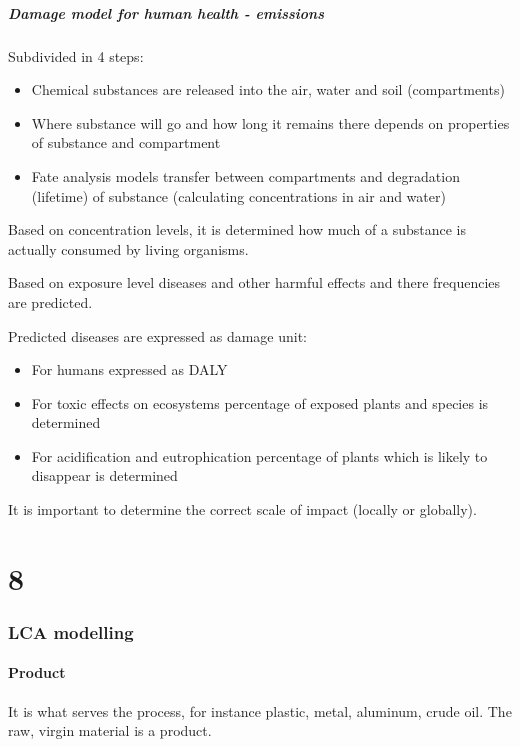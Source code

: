 \documentclass{article}
\begin{document}
\newpage
\subsubsection{Damage model for human health - emissions}
Subdivided in 4 steps:

\vspace*{-.4cm}
\begin{itemize}
    \item Chemical substances are released into the air, water and soil (compartments)
    \item Where substance will go and how long it remains there depends on properties of substance and compartment
    \item Fate analysis models transfer between compartments and degradation (lifetime) of substance (calculating concentrations in air and water)
\end{itemize}

Based on concentration levels, it is determined how much of a substance is actually consumed by living organisms.

Based on exposure level diseases and other harmful effects and there frequencies are predicted.

Predicted diseases are expressed as damage unit:
\begin{itemize}
    \item For humans expressed as DALY
    \item For toxic effects on ecosystems percentage of exposed plants and species is determined
    \item For acidification and eutrophication percentage of plants which is likely to disappear is determined
\end{itemize}

It is important to determine the correct scale of impact (locally or globally).

\part{8}
\section{LCA modelling}
\subsection{Product}
It is what serves the process, for instance plastic, metal, aluminum,
crude oil. The raw, virgin material is a product.
\end{document}

